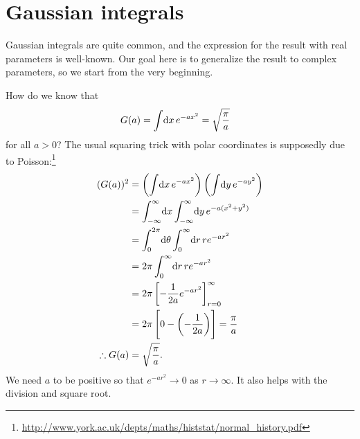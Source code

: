 \section{Gaussian integrals}

Gaussian integrals are quite common, and the expression for the result with real parameters is well-known.
Our goal here is to generalize the result to complex parameters, so we start from the very beginning.

How do we know that
\begin{align}
	G(a)
	&= \int\! \dif x \, e^{-a x^2}
	= \sqrt{\frac{\pi}{a}}
		\label{eq:gaussian-integral-a}
\end{align}
for all $a > 0$?
The usual squaring trick with polar coordinates is supposedly due to Poisson:\footnote{
	\url{http://www.york.ac.uk/depts/maths/histstat/normal_history.pdf}
}
\begin{subequations}
\begin{align}
	(G(a))^2
	&= \left( \int\! \dif x \, e^{-a x^2} \right) \left( \int\! \dif y \, e^{-a y^2} \right) \\
	&= \int_{-\infty}^\infty\! \dif x \int_{-\infty}^\infty\! \dif y \, e^{-a (x^2 + y^2)} \\
	&= \int_0^{2 \pi}\! \dif \theta \int_0^\infty\! \dif r \, r e^{-a r^2} \\
	&= 2 \pi \int_0^\infty\! \dif r \, r e^{-a r^2} \\
	&= 2 \pi \left[ -\frac{1}{2 a} e^{-a r^2} \right]_{r=0}^\infty \\
	&= 2 \pi \left[ 0 - \left( -\frac{1}{2 a} \right) \right]
	= \frac{\pi}{a} \\
	\therefore
	G(a)
	&= \sqrt{\frac{\pi}{a}}.
\end{align}
\end{subequations}
We need $a$ to be positive so that $e^{-a r^2} \to 0$ as $r \to \infty$.
It also helps with the division and square root.

